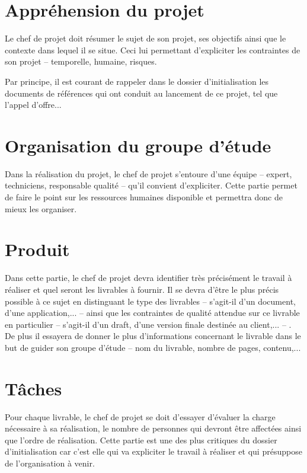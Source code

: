 \documentclass[a4paper, 11pt, draft]{article}
\begin{document}
\section{Appréhension du projet}

Le chef de projet doit résumer le sujet de son projet, ses objectifs ainsi que le contexte dans lequel il se situe. Ceci lui permettant d'expliciter les contraintes de son projet -- temporelle, humaine, risques.

Par principe, il est courant de rappeler dans le dossier d'initialisation les documents de références qui ont conduit au lancement de ce projet, tel que l'appel d'offre...

\section{Organisation du groupe d'étude}

Dans la réalisation du projet, le chef de projet s'entoure d'une équipe -- expert, techniciens, responsable qualité -- qu'il convient d'expliciter. Cette partie permet de faire le point sur les ressources humaines disponible et permettra donc de mieux les organiser.


\section{Produit}

Dans cette partie, le chef de projet devra identifier très précisément le travail à réaliser et quel seront les livrables à fournir. Il se devra d'être le plus précis possible à ce sujet en distinguant le type des livrables -- s'agit-il d'un document, d'une application,... -- ainsi que les contraintes de qualité attendue sur ce livrable en particulier -- s'agit-il d'un draft, d'une version finale destinée au client,... -- . De plus il essayera de donner le plus d'informations concernant le livrable dans le but de guider son groupe d'étude -- nom du livrable, nombre de pages, contenu,...

\section{Tâches}

Pour chaque livrable, le chef de projet se doit d'essayer d'évaluer la charge nécessaire à sa réalisation, le nombre de personnes qui devront être affectées ainsi que l'ordre de réalisation. Cette partie est une des plus critiques du dossier d'initialisation car c'est elle qui va expliciter le travail à réaliser et qui présuppose de l'organisation à venir.
\end{document}
